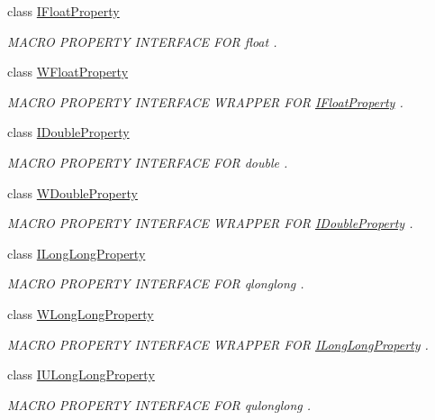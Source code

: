 \begin{DoxyCompactItemize}
class \hyperlink{class_i_float_property}{I\-Float\-Property}
\begin{DoxyCompactList}\small\item\em M\-A\-C\-R\-O P\-R\-O\-P\-E\-R\-T\-Y I\-N\-T\-E\-R\-F\-A\-C\-E F\-O\-R float . \end{DoxyCompactList}\item 
class \hyperlink{class_w_float_property}{W\-Float\-Property}
\begin{DoxyCompactList}\small\item\em M\-A\-C\-R\-O P\-R\-O\-P\-E\-R\-T\-Y I\-N\-T\-E\-R\-F\-A\-C\-E W\-R\-A\-P\-P\-E\-R F\-O\-R \hyperlink{class_i_float_property}{I\-Float\-Property} . \end{DoxyCompactList}\item 
class \hyperlink{class_i_double_property}{I\-Double\-Property}
\begin{DoxyCompactList}\small\item\em M\-A\-C\-R\-O P\-R\-O\-P\-E\-R\-T\-Y I\-N\-T\-E\-R\-F\-A\-C\-E F\-O\-R double . \end{DoxyCompactList}\item 
class \hyperlink{class_w_double_property}{W\-Double\-Property}
\begin{DoxyCompactList}\small\item\em M\-A\-C\-R\-O P\-R\-O\-P\-E\-R\-T\-Y I\-N\-T\-E\-R\-F\-A\-C\-E W\-R\-A\-P\-P\-E\-R F\-O\-R \hyperlink{class_i_double_property}{I\-Double\-Property} . \end{DoxyCompactList}\item 
class \hyperlink{class_i_long_long_property}{I\-Long\-Long\-Property}
\begin{DoxyCompactList}\small\item\em M\-A\-C\-R\-O P\-R\-O\-P\-E\-R\-T\-Y I\-N\-T\-E\-R\-F\-A\-C\-E F\-O\-R qlonglong . \end{DoxyCompactList}\item 
class \hyperlink{class_w_long_long_property}{W\-Long\-Long\-Property}
\begin{DoxyCompactList}\small\item\em M\-A\-C\-R\-O P\-R\-O\-P\-E\-R\-T\-Y I\-N\-T\-E\-R\-F\-A\-C\-E W\-R\-A\-P\-P\-E\-R F\-O\-R \hyperlink{class_i_long_long_property}{I\-Long\-Long\-Property} . \end{DoxyCompactList}\item 
class \hyperlink{class_i_u_long_long_property}{I\-U\-Long\-Long\-Property}
\begin{DoxyCompactList}\small\item\em M\-A\-C\-R\-O P\-R\-O\-P\-E\-R\-T\-Y I\-N\-T\-E\-R\-F\-A\-C\-E F\-O\-R qulonglong . \end{DoxyCompactList}\item 

\end{DoxyCompactItemize}
